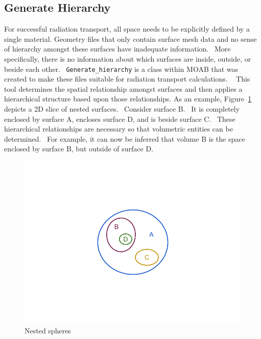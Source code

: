\subsection{Generate Hierarchy}
\label{sec:genhi}
For successful radiation transport, all space needs to be explicitly defined by a single material. 
Geometry files that only contain surface mesh data and no sense of hierarchy amongst these surfaces
have inadequate information.  More specifically, there is no information about which surfaces are inside,
outside, or beside each other.  \texttt{Generate\_hierarchy} is a class within MOAB \cite{genhi} that was created to
make these files suitable for radiation transport calculations.   This tool determines the spatial relationship
amongst surfaces and then applies a hierarchical structure based upon those relationships. As an example, 
Figure~\ref{fig:spheres} depicts a 2D slice of nested surfaces.  Consider surface B.  It is completely enclosed by surface A, 
encloses surface D, and is beside surface C.  These hierarchical relationships are necessary so that 
volumetric entities can be determined.  For example, it can now be inferred that volume B is the space enclosed by 
surface B, but outside of surface D.

\begin{figure}[h!]
 \begin{centering}
 \centering
 \includegraphics[width=\paperwidth]{../figs/nested_spheres.png}
 \caption{Nested spheres}
 \label{fig:spheres}
 \end{centering}
\end{figure}

